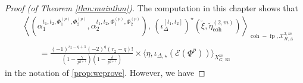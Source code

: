 \documentclass[cjm]{ipart}
\theoremstyle{plain}
\newtheorem{theorem}{Theorem}[subsection]
\theoremstyle{remark}
\DeclareMathOperator{\coh}{coh}
\DeclareMathOperator{\fp}{fp}
\DeclareMathOperator{\Kl}{Kl}
\newcommand{\cE}{\mathcal{E}}
\newcommand{\cL}{\mathcal{L}}
\newcommand{\cX}{\mathcal{X}}
\newcommand{\uPhi}{\underline{\Phi}}
\newcommand{\wZ}{\widetilde{Z}}
\numberwithin{equation}{subsection}
\renewcommand{\le}{\leqslant}
\begin{document}
   \begin{proof}[Proof (of Theorem \ref{thm:mainthm})]
    The computation in this chapter shows that
    \begin{align*}
      &\left\langle  \left( \alpha^{t_1,t_2,\Phi^{(p)}_1,\Phi^{(p)}_2}_1 , \alpha^{t_1,t_2,\Phi_1^{(p)},\Phi_2^{(p)}}_2\right),\,  \left(\iota^{[t_1,t_2]}_\Delta\right)^\star(\breve\xi,\breve\eta^{(2,m)}_{\coh})\right\rangle_{\coh-\fp,\cX^{2,m}_{H,\Delta}}\\
     &\qquad = \frac{(-1)^{r_2 - q+1}(-2)^q (r_2 - q)!}{\left(1 - \tfrac{ \gamma}{p^{q+1}}\right)\left(1 - \tfrac{\delta}{p^{q+1}}\right)}\times \langle \eta, \iota_{\Delta, \star}(\cE(\uPhi^p))\rangle_{X_{G, \Kl}^m}
    \end{align*}
    in the notation of \cref{prop:weprove}. However, we have
    

\end{proof}
\end{document}
